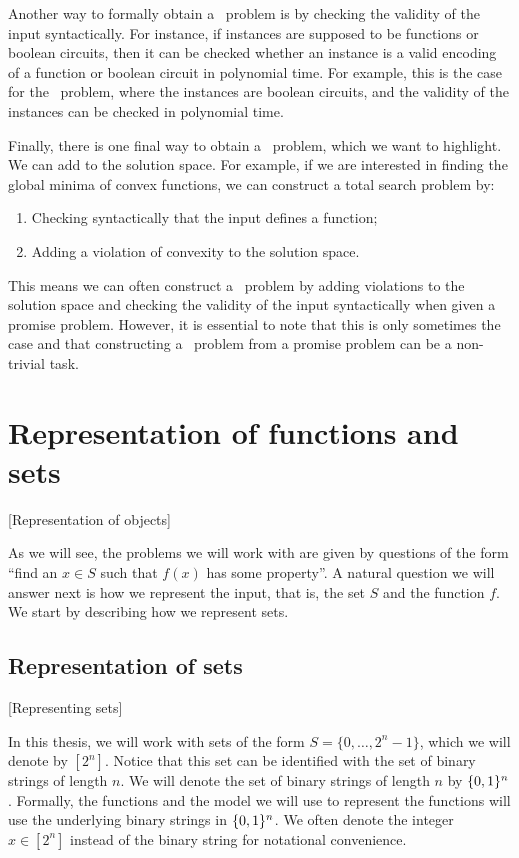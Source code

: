 Another way to formally obtain a \TFNP\ problem is by checking the validity of the input syntactically. For instance, if instances are supposed to be functions or boolean circuits, then it can be checked whether an instance is a valid encoding of a function or boolean circuit in polynomial time. For example, this is the case for the \Tarski\ problem, where the instances are boolean circuits, and the validity of the instances can be checked in polynomial time.

Finally, there is one final way to obtain a \TFNP\ problem, which we want to highlight. We can add  to the solution space. For example, if we are interested in finding the global minima of convex functions, we can construct a total search problem by:
\begin{enumerate}
    \item Checking syntactically that the input defines a function;
    \item Adding a violation of convexity to the solution space.
\end{enumerate}

This means we can often construct a \TFNP\ problem by adding violations to the solution space and checking the validity of the input syntactically when given a promise problem. However, it is essential to note that this is only sometimes the case and that constructing a \TFNP\ problem from a promise problem can be a non-trivial task.

\section{Representation of functions and sets}[Representation of objects]

As we will see, the problems we will work with are given by questions of the form ``find an $x \in S$ such that $f(x)$ has some property''. A natural question we will answer next is how we represent the input, that is, the set $S$ and the function $f$. We start by describing how we represent sets.

\subsection{Representation of sets}[Representing sets]

In this thesis, we will work with sets of the form $S = \{0, \dots, 2^n - 1\}$, which we will denote by $[2^n]$. Notice that this set can be identified with the set of binary strings of length $n$. We will denote the set of binary strings of length $n$ by $\{0, 1\}^n$. Formally, the functions and the model we will use to represent the functions will use the underlying binary strings in $\{0, 1\}^n$. We often denote the integer $x \in [2^n]$ instead of the binary string for notational convenience.

